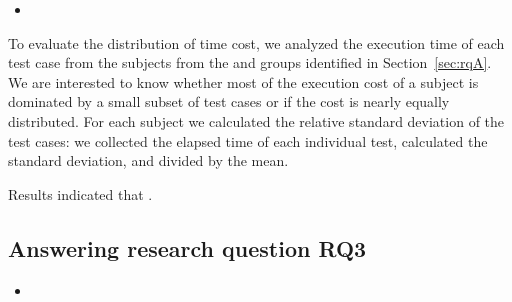 \begin{itemize}
    \item \emph{\RQB}
\end{itemize}

To evaluate the distribution of time cost, we analyzed the execution
time of each test case from the \numMedLong{} subjects from the
\longg{} and \medg{} groups identified in Section~\ref{sec:rqA}. We
are interested to know whether most of the execution cost of a subject
is dominated by a small subset of test cases or if the cost is nearly
equally distributed. For each subject we calculated the relative
standard deviation of the test cases: we collected the elapsed time of
each individual test, calculated the standard deviation, and divided
by the mean. 

Results indicated that .  


\subsection{Answering research question RQ3}
\label{sec:rqC}

\begin{itemize}
    \item \emph{\RQC}
\end{itemize}


